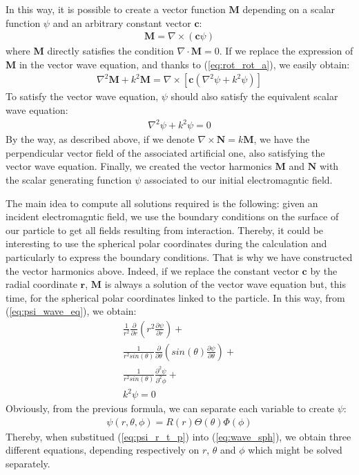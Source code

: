 \documentclass{article}
\begin{document}
In this way, it is possible to create a vector function $\textbf{M}$ depending on a scalar function $\psi$ and an arbitrary constant vector $\textbf{c}$:
\begin{align}
\textbf{M} = \nabla \times (\textbf{c}\psi)
\end{align}
where \textbf{M} directly satisfies the condition $\nabla \cdot \textbf{M} = 0$. If we replace the expression of \textbf{M} in the vector wave equation, and thanks to (\ref{eq:rot_rot_a}), we easily obtain:
\begin{align}
\nabla ^{2} \textbf{M} + k^{2}\textbf{M} = \nabla \times [\textbf{c}(\nabla ^{2} \psi + k^{2}\psi)]
\end{align}
To satisfy the vector wave equation, $\psi$ should also satisfy the equivalent scalar wave equation:
\begin{align}\label{eq:psi_wave_eq}
\nabla ^{2} \psi + k^{2}\psi = 0
\end{align}
By the way, as described above, if we denote $\nabla \times \textbf{N} = k \textbf{M}$, we have the perpendicular vector field of the associated artificial one, also satisfying the vector wave equation. Finally, we created the vector harmonics $\textbf{M}$ and $\textbf{N}$ with the scalar generating function $\psi$ associated to our initial electromagntic field.

The main idea to compute all solutions required is the following: given an incident electromagntic field, we use the boundary conditions on the surface of our particle to get all fields resulting from interaction. Thereby, it could be interesting to use the spherical polar coordinates during the calculation and particularly to express the boundary conditions. That is why we have constructed the vector harmonics above. Indeed, if we replace the constant vector $\textbf{c}$ by the radial coordinate $\textbf{r}$, $\textbf{M}$ is always a solution of the vector wave equation but, this time, for the spherical polar coordinates linked to the particle. In this way, from (\ref{eq:psi_wave_eq}), we obtain:
\begin{equation}\label{eq:wave_sph}
\begin{aligned}
\frac{1}{r^{2}}\frac{\partial }{\partial r}(r^{2}\frac{\partial \psi}{\partial r}) + \\ 
\frac{1}{r^{2}sin(\theta)}\frac{\partial }{\partial \theta}(sin(\theta)\frac{\partial \psi}{\partial \theta}) + \\
\frac{1}{r^{2}sin(\theta)}\frac{\partial^{2} \psi}{\partial^{2} \phi} + \\
k^{2}\psi = 0
\end{aligned}
\end{equation}
Obviously, from the previous formula, we can separate each variable to create $\psi$:
\begin{align}\label{eq:psi_r_t_p}
\psi(r, \theta, \phi) = R(r)\Theta(\theta)\Phi(\phi)
\end{align}
Thereby, when substitued (\ref{eq:psi_r_t_p}) into (\ref{eq:wave_sph}), we obtain three different equations, depending respectively on $r$, $\theta$ and $\phi$ which might be solved separately.
\end{document}
